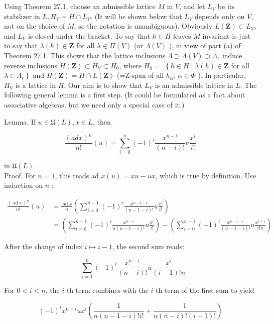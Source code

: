 \documentclass[10pt]{article}
\begin{document}
Using Theorem 27.1, choose an admissible lattice $M$ in $V$, and let $L_{V}$ be its stabilizer in $L, H_{V}=H \cap L_{V}$. (It will be shown below that $L_{V}$ depends only on $V$, not on the choice of $M$, so the notation is unambiguous). Obviously $L(\mathbf{Z}) \subset L_{V}$, and $L_{V}$ is closed under the bracket. To say that $h \in H$ leaves $M$ invariant is just to say that $\lambda(h) \in \mathbf{Z}$ for all $\lambda \in \Pi(V)$ (or $\Lambda(V)$ ), in view of part (a) of Theorem 27.1. This shows that the lattice inclusions $\Lambda \supset \Lambda(V) \supset \Lambda_{r}$ induce reverse inclusions $H(\mathbf{Z}) \subset H_{V} \subset H_{0}$, where $H_{0}=$ $\left\{h \in H \mid \lambda(h) \in \mathbf{Z}\right.$ for all $\left.\lambda \in \Lambda_{r}\right\}$ and $H(\mathbf{Z})=H \cap L(\mathbf{Z})$ (=Z-span of all $h_{\alpha}$, $\alpha \in \Phi$ ). In particular, $H_{V}$ is a lattice in $H$. Our aim is to show that $L_{V}$ is an admissible lattice in $L$. The following general lemma is a first step. (It could be formulated as a fact about associative algebras, but we need only a special case of it.)

Lemma. If $u \in \mathfrak{U}(L), x \in L$, then

$$
\frac{(a d x)^{n}}{n!}(u)=\sum_{i=0}^{n}(-1)^{i} \frac{x^{n-i}}{(n-i)!} u \frac{x^{i}}{i!}
$$

in $\mathfrak{U}(L)$.\\
Proof. For $n=1$, this reads ad $x(u)=x u-u x$, which is true by definition. Use induction on $n$ :

$$
\begin{aligned}
\frac{(\operatorname{ad} x)^{n}}{n!}(u) & =\frac{\operatorname{ad} x}{n}\left(\sum_{i=0}^{n-1}(-1)^{i} \frac{x^{n-1-i}}{(n-1-i)!} u \frac{x^{i}}{i!}\right) \\
& =\left(\sum_{i=0}^{n-1}(-1)^{i} \frac{x^{n-i}}{n(n-1-i)!} u \frac{x^{i}}{i!}\right)-\left(\sum_{i=0}^{n-1}(-1)^{i} \frac{x^{n-1-i}}{(n-1-i)!} u \frac{x^{i+1}}{i!n}\right)
\end{aligned}
$$

After the change of index $i \mapsto i-1$, the second sum reads:

$$
-\sum_{i=1}^{n}(-1)^{i} \frac{x^{n-i}}{(n-i)!} u \frac{x^{i}}{(i-1)!n}
$$

For $0<i<n$, the $i$ th term combines with the $i$ th term of the first sum to yield

$$
(-1)^{i} x^{n-i} u x^{i}\left(\frac{1}{n(n-1-i)!i!}+\frac{1}{n(n-i)!(i-1)!}\right)
$$
\end{document}
